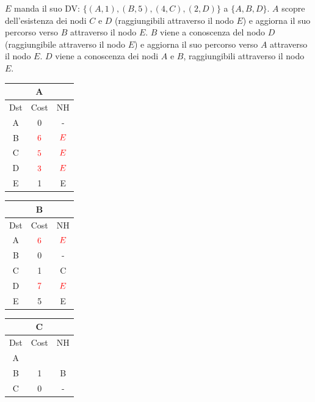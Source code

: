\documentclass[10pt]{article}
\begin{document}
			\newline \newline \newline \newline
			$E$ manda il suo DV: $\{(A,1),(B,5),(4,C),(2,D)\}$ a $\{A,B,D\}$.
			\newline
			$A$ scopre dell'esistenza dei nodi $C$ e $D$ (raggiungibili attraverso il nodo $E$) e aggiorna il suo percorso verso $B$ attraverso il nodo $E$.
			\newline
			$B$ viene a conoscenza del nodo $D$ (raggiungibile attraverso il nodo $E$) e aggiorna il suo percorso verso $A$ attraverso il nodo $E$.
			\newline
			$D$ viene a conoscenza dei nodi $A$ e $B$, raggiungibili attraverso il nodo $E$.
			\begin{table}[h!]
				\begin{tabular}{|c||c||c|}
					\hline
					\multicolumn{3}{|c|}{A} \\
					\hline
					Dst & Cost & NH \\
					\hline
					A & 0 & - \\
					B & $\color{red} 6$  & $\color{red} E$ \\
					C & $\color{red} 5$  & $\color{red} E$ \\
					D & $\color{red} 3$  & $\color{red} E$ \\
					E & 1 & E \\
					\hline
				\end{tabular}
				\begin{tabular}{|c||c||c|}
					\hline
					\multicolumn{3}{|c|}{B} \\
					\hline
					Dst & Cost & NH \\
					\hline
					A & $\color{red} 6$  & $\color{red} E$ \\
					B & 0 & - \\
					C & 1 & C \\
					D & $\color{red} 7$  & $\color{red} E$ \\
					E & 5 & E \\
					\hline
				\end{tabular}
				\begin{tabular}{|c||c||c|}
					\hline
					\multicolumn{3}{|c|}{C} \\
					\hline
					Dst & Cost & NH \\
					\hline
					A &   &   \\
					B & 1 & B \\
					C & 0 & - \\

\end{tabular}
\end{table}
\end{document}
